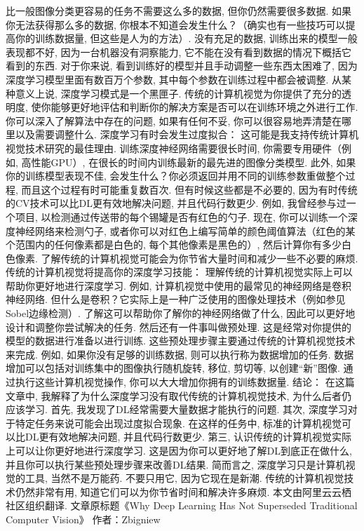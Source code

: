 比一般图像分类更容易的任务不需要这么多的数据, 但你仍然需要很多数据. 如果你无法获得那么多的数据, 你根本不知道会发生什么？（确实也有一些技巧可以提高你的训练数据量, 但这些是人为的方法）.
没有充足的数据, 训练出来的模型一般表现都不好, 因为一台机器没有洞察能力, 它不能在没有看到数据的情况下概括它看到的东西.
对于你来说, 看到训练好的模型并且手动调整一些东西太困难了, 因为深度学习模型里面有数百万个参数, 其中每个参数在训练过程中都会被调整. 从某种意义上说, 深度学习模式是一个黑匣子.
传统的计算机视觉为你提供了充分的透明度, 使你能够更好地评估和判断你的解决方案是否可以在训练环境之外进行工作. 你可以深入了解算法中存在的问题, 如果有任何不妥, 你可以很容易地弄清楚在哪里以及需要调整什么. 深度学习有时会发生过度拟合：
这可能是我支持传统计算机视觉技术研究的最佳理由. 训练深度神经网络需要很长时间, 你需要专用硬件（例如, 高性能GPU）, 在很长的时间内训练最新的最先进的图像分类模型.
此外, 如果你的训练模型表现不佳, 会发生什么？你必须返回并用不同的训练参数重做整个过程, 而且这个过程有时可能重复数百次.
但有时候这些都是不必要的, 因为有时传统的CV技术可以比DL更有效地解决问题, 并且代码行数更少. 例如, 我曾经参与过一个项目, 以检测通过传送带的每个锡罐是否有红色的勺子. 现在, 你可以训练一个深度神经网络来检测勺子, 或者你可以对红色上编写简单的颜色阈值算法（红色的某个范围内的任何像素都是白色的, 每个其他像素是黑色的）, 然后计算你有多少白色像素.
了解传统的计算机视觉可能会为你节省大量时间和减少一些不必要的麻烦. 传统的计算机视觉将提高你的深度学习技能：
理解传统的计算机视觉实际上可以帮助你更好地进行深度学习.
例如, 计算机视觉中使用的最常见的神经网络是卷积神经网络. 但什么是卷积？它实际上是一种广泛使用的图像处理技术（例如参见Sobel边缘检测）. 了解这可以帮助你了解你的神经网络做了什么, 因此可以更好地设计和调整你尝试解决的任务.
然后还有一件事叫做预处理. 这是经常对你提供的模型的数据进行准备以进行训练. 这些预处理步骤主要通过传统的计算机视觉技术来完成. 例如, 如果你没有足够的训练数据, 则可以执行称为数据增加的任务. 数据增加可以包括对训练集中的图像执行随机旋转, 移位, 剪切等, 以创建“新”图像. 通过执行这些计算机视觉操作, 你可以大大增加你拥有的训练数据量. 结论：
在这篇文章中, 我解释了为什么深度学习没有取代传统的计算机视觉技术, 为什么后者仍应该学习. 首先, 我发现了DL经常需要大量数据才能执行的问题. 其次, 深度学习对于特定任务来说可能会出现过度拟合现象. 在这样的任务中, 标准的计算机视觉可以比DL更有效地解决问题, 并且代码行数更少. 第三, 认识传统的计算机视觉实际上可以让你更好地进行深度学习. 这是因为你可以更好地了解DL到底正在做什么, 并且你可以执行某些预处理步骤来改善DL结果.
简而言之, 深度学习只是计算机视觉的工具, 当然不是万能药. 不要只用它, 因为它现在是新潮. 传统的计算机视觉技术仍然非常有用, 知道它们可以为你节省时间和解决许多麻烦.
本文由阿里云云栖社区组织翻译.
文章原标题《Why Deep Learning Has Not Superseded Traditional Computer Vision》
作者：Zbigniew

